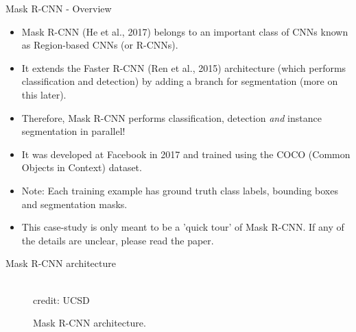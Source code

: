\begin{frame} {Mask R-CNN - Overview}
  \begin{itemize}
    \item Mask R-CNN (He et al., 2017) belongs to an important class of CNNs known as Region-based CNNs (or R-CNNs).
    \item It extends the Faster R-CNN (Ren et al., 2015) architecture (which performs classification and detection) by adding a branch for segmentation (more on this later).
    \item Therefore, Mask R-CNN performs classification, detection \textit{and} instance segmentation in parallel!
    \item It was developed at Facebook in 2017 and trained using the COCO (Common Objects in Context) dataset.
    \item Note: Each training example has ground truth class labels, bounding boxes and segmentation masks.
    \item This case-study is only meant to be a 'quick tour' of Mask R-CNN. If any of the details are unclear, please read the paper.
  \end{itemize}
\end{frame}

\begin{frame} {Mask R-CNN architecture}
  \begin{figure}
    \centering
      \tiny{\\credit: UCSD}
      \caption{Mask R-CNN architecture.}
  \end{figure}
\end{frame}

